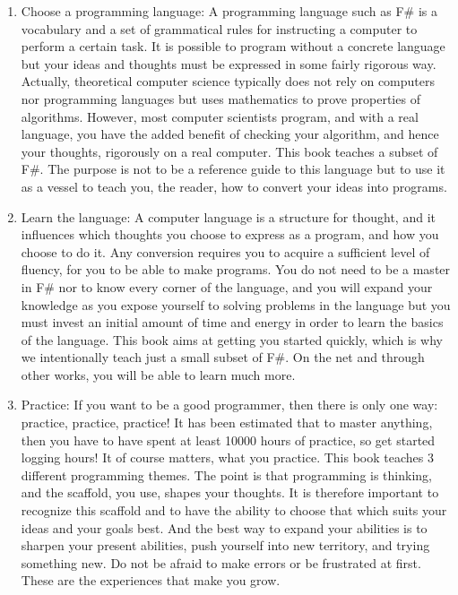 \begin{enumerate}
\item Choose a programming language: A programming language such as F\# is a vocabulary and a set of grammatical rules for instructing a computer to perform a certain task. It is possible to program without a concrete language but your ideas and thoughts must be expressed in some fairly rigorous way. Actually, theoretical computer science typically does not rely on computers nor programming languages but uses mathematics to prove properties of algorithms. However, most computer scientists program, and with a real language, you have the added benefit of checking your algorithm, and hence your thoughts, rigorously on a real computer. This book teaches a subset of F\#. The purpose is not to be a reference guide to this language but to use it as a vessel to teach you, the reader, how to convert your ideas into programs.
\item Learn the language: A computer language is a structure for thought, and it influences which thoughts you choose to express as a program, and how you choose to do it. Any conversion requires you to acquire a sufficient level of fluency, for you to be able to make programs. You do not need to be a master in F\# nor to know every corner of the language, and you will expand your knowledge as you expose yourself to solving problems in the language but you must invest an initial amount of time and energy in order to learn the basics of the language. This book aims at getting you started quickly, which is why we intentionally teach just a small subset of F\#. On the net and through other works, you will be able to learn much more.
\item Practice: If you want to be a good programmer, then there is only one way: practice, practice, practice! It has been estimated that to master anything, then you have to have spent at least 10000 hours of practice, so get started logging hours! It of course matters, what you practice. This book teaches 3 different programming themes. The point is that programming is thinking, and the scaffold, you use, shapes your thoughts. It is therefore important to recognize this scaffold and to have the ability to choose that which suits your ideas and your goals best. And the best way to expand your abilities is to sharpen your present abilities, push yourself into new territory, and trying something new. Do not be afraid to make errors or be frustrated at first. These are the experiences that make you grow.

\end{enumerate}
